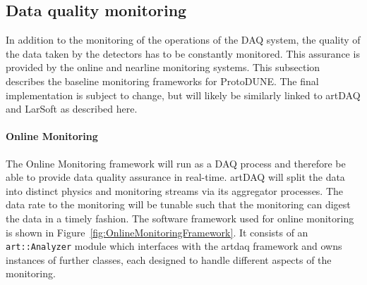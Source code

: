 

\subsection{Data quality monitoring}

In addition to the monitoring of the operations of the DAQ system, the
quality of the data taken by the detectors has to be constantly monitored.
This assurance is provided by the online and nearline monitoring systems.
This subsection describes the baseline monitoring frameworks for ProtoDUNE.  
The final implementation is subject to change, but will likely be similarly
linked to artDAQ and LarSoft as described here.

\paragraph{Online Monitoring}
The Online Monitoring framework will run as a DAQ process and therefore be
able to provide data quality assurance in real-time. artDAQ will split the  
data into distinct physics and monitoring streams via its aggregator processes.  
The data rate to the monitoring will be tunable such that the monitoring 
can digest the data in a timely fashion.
The software framework used for online monitoring is
shown in Figure~\ref{fig:OnlineMonitoringFramework}.  It consists of an
\texttt{art::Analyzer} module which interfaces with the artdaq framework and
owns instances of further classes, each designed to handle different aspects
of the monitoring.  

